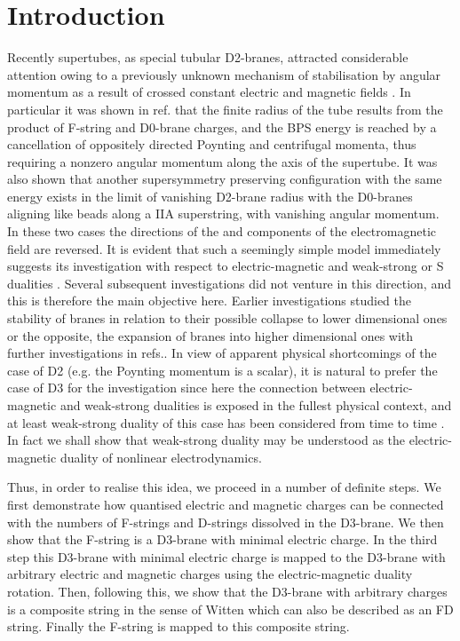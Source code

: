 \documentclass[a4paper,12pt]{article}
\begin{document}
\newpage
\section{Introduction}
 
Recently supertubes,  as special tubular D2-branes, 
attracted considerable attention owing to
a previously unknown mechanism of stabilisation by
angular momentum as a result
of crossed constant electric and magnetic fields \cite{1}.
In particular it was shown in ref. \cite{1}
that the finite radius of the
tube results
from the product of F-string and D0-brane charges,
and the BPS energy is reached by a cancellation
of oppositely directed Poynting and centrifugal momenta,
thus requiring a nonzero angular momentum along the axis of the
supertube.
It was also shown that another supersymmetry
preserving configuration with the
same energy exists in the limit of vanishing
D2-brane radius with the D0-branes
aligning like beads along a IIA superstring,
with  vanishing angular momentum.
In these two cases the directions of the
\coordHE{}  and \coordHE{}  components 
of the electromagnetic field are reversed.
It is evident that such a seemingly simple model
immediately suggests its investigation
with respect to electric-magnetic \cite{2,3,4} 
 and weak-strong or S dualities \cite{5,6}.
Several subsequent investigations \cite{7,8,9} did not venture
in this direction, and this is therefore the main  objective  here.
Earlier  investigations \cite{10,11,12} 
studied the
stability  of branes in relation 
to their possible  collapse  to lower dimensional ones 
\cite{10,11,12} 
or the opposite, the expansion of branes into
higher dimensional ones \cite{9,13,14}
with further investigations in refs.\cite{14,15}.
  In view of
apparent physical shortcomings of the case of D2
 (e.g. the Poynting momentum
is a scalar),  it is natural to prefer the case
of D3 for the investigation since here
the connection between electric-magnetic and 
weak-strong dualities is exposed in the fullest physical
context, and at least weak-strong duality of this case
has been considered from time to time \cite{16}.  In fact we shall
show that weak-strong  duality may be understood
as the electric-magnetic duality of nonlinear 
electrodynamics.

Thus, in order to realise this idea, we proceed
in a number of definite steps. We first
demonstrate how quantised
electric and magnetic charges can be
connected with the numbers of
F-strings and D-strings dissolved in the
D3-brane.  We then show that the F-string is a D3-brane with
minimal electric charge.  In the third step
this D3-brane with minimal electric charge is mapped to the
D3-brane with arbitrary  electric and magnetic charges using
the electric-magnetic duality rotation.
Then, following this, we show that the D3-brane with arbitrary charges
is a composite string in the sense of Witten\cite{17} which can
also be described as an FD string\cite{18}.
Finally the
F-string
is mapped to this composite  string.
\end{document}
